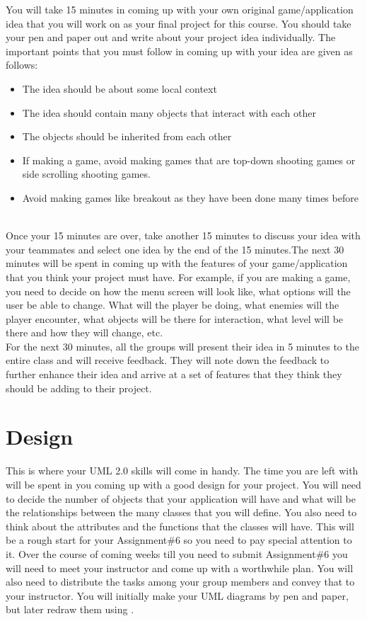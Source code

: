 \documentclass[11pt,fleqn]{book} %
\begin{document}
You will take 15 minutes in coming up with your own original game/application idea that you will work on as your final project for this course. You should take your pen and paper out and write about your project idea individually. The important points that you must follow in coming up with your idea are given as follows:
~\\
\begin{itemize}
	\item The idea should be about some local context
	\item The idea should contain many objects that interact with each other
	\item The objects should be inherited from each other
	\item If making a game, avoid making games that are top-down shooting games or side scrolling shooting games.
	\item Avoid making games like breakout as they have been done many times before
\end{itemize}
~\\
\noindent Once your 15 minutes are over, take another 15 minutes to discuss your idea with your teammates and select one idea by the end of the 15 minutes.The next 30 minutes will be spent in coming up with the features of your game/application that you think your project must have. For example, if you are making a game, you need to decide on how the menu screen will look like, what options will the user be able to change. What will the player be doing, what enemies will the player encounter, what objects will be there for interaction, what level will be there and how they will change, etc.
~\\
\noindent For the next 30 minutes, all the groups will present their idea in 5 minutes to the entire class and will receive feedback. They will note down the feedback to further enhance their idea and arrive at a set of features that they think they should be adding to their project.

\section{Design}
This is where your UML 2.0 skills will come in handy. The time you are left with will be spent in you coming up with a good design for your project. You will need to decide the number of objects that your application will have and what will be the relationships between the many classes that you will define. You also need to think about the attributes and the functions that the classes will have. This will be a rough start for your Assignment\#6 so you need to pay special attention to it. Over the course of coming weeks till you need to submit Assignment\#6 you will need to meet your instructor and come up with a worthwhile plan. You will also need to distribute the tasks among your group members and convey that to your instructor. You will initially make your UML diagrams by pen and paper, but later redraw them using .
\end{document}
